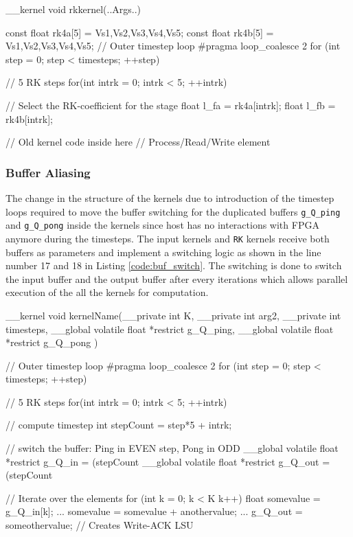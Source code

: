 \begin{CppCode}[caption=Use of Runge-Kutta coefficients inside the \texttt{RK} kernel, frame=tlrb, label=code:rkcoeff, float]
__kernel void rkkernel(..Args..)
{
    const float rk4a[5] = {Vs1,Vs2,Vs3,Vs4,Vs5};
    const float rk4b[5] = {Vs1,Vs2,Vs3,Vs4,Vs5};
    // Outer timestep loop
    #pragma loop_coalesce 2
    for (int step = 0; step < timesteps; ++step)
    {
        // 5 RK steps
        for(int intrk = 0; intrk < 5; ++intrk)
        {
            // Select the RK-coefficient for the stage
            float l_fa = rk4a[intrk];
            float l_fb = rk4b[intrk];

            // Old kernel code inside here
            // Process/Read/Write element
        }
    }
}
\end{CppCode}

\subsubsection*{Buffer Aliasing}

The change in the structure of the kernels due to introduction of the timestep loops
required to move the buffer switching for the duplicated buffers \texttt{g\_Q\_ping} and
\texttt{g\_Q\_pong} inside the kernels since host has no interactions with FPGA anymore
during the timesteps. The input kernels and \texttt{RK} kernels receive both buffers as parameters
and implement a switching logic as shown in the line number 17 and 18 in Listing \ref{code:buf_switch}.
The switching is done to switch the input buffer and the output buffer after every iterations
which allows parallel execution of the all the kernels for computation.
\begin{CppCode}[caption=Buffer switching for FPGA only design within the kernel, frame=tlrb, label=code:buf_switch, float]
__kernel void kernelName(__private int K,  __private int arg2,  __private int timesteps,
                        __global volatile float  *restrict g_Q_ping,
                        __global volatile float  *restrict g_Q_pong
                        )
{
    // Outer timestep loop
    #pragma loop_coalesce 2
    for (int step = 0; step < timesteps; ++step)
    {
        // 5 RK steps
        for(int intrk = 0; intrk < 5; ++intrk)
        {
            // compute timestep
            int stepCount = step*5 + intrk;

            // switch the buffer: Ping in EVEN step, Pong in ODD
            __global volatile float *restrict g_Q_in = (stepCount%
            __global volatile float *restrict g_Q_out = (stepCount%

            // Iterate over the elements
            for (int k = 0; k < K k++)
            {
                float somevalue = g_Q_in[k];
                ...
                somevalue = somevalue + anothervalue;
                ...
                g_Q_out = someothervalue; // Creates Write-ACK LSU
            }
        }
    }
}
\end{CppCode}

